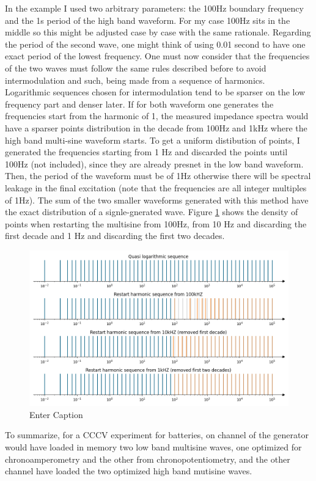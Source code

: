 In the example I used two arbitrary parameters: the 100Hz boundary frequency and the 1s period of the high band waveform. For my case 100Hz sits in the middle so this might be adjusted case by case with the same rationale. Regarding the period of the second wave, one might think of using 0.01 second to have one exact period of the lowest frequency. One must now consider that the frequencies of the two waves must follow the same rules described before to avoid intermodulation and such, being made from a sequence of harmonics. Logarithmic sequences chosen for intermodulation tend to be sparser on the low frequency part and denser later. If for both waveform one generates the frequencies start from the harmonic of 1, the measured impedance spectra would have a sparser points distribution in the decade from 100Hz and 1kHz where the  high band multi-sine waveform starts. To get a uniform distibution of points, I generated the frequencies starting from 1 Hz and discarded the points until 100Hz (not included), since they are already presnet in the low band waveform. Then, the period of the waveform must be of 1Hz otherwise there will be spectral leakage in the final excitation (note that the frequencies are all integer multiples of 1Hz). The sum of the two smaller waveforms generated with this method have the exact distribution of a signle-gnerated wave. Figure \ref{fig:splitting_design} shows the density of points when restarting the multisine from 100Hz, from 10 Hz and discarding the first decade and 1 Hz and discarding the first two decades.
\begin{figure}[h]
    \centering
    \includegraphics[width=1\linewidth]{figures/harmonics_supporting.png}
    \caption{Enter Caption}
    \label{fig:splitting_design}
\end{figure}
To summarize, for a CCCV experiment for batteries, on channel of the generator would have loaded in memory two low band multisine waves, one optimized for chronoamperometry and the other from chronopotentiometry, and the other channel have loaded the two optimized high band mutisine waves.\\

